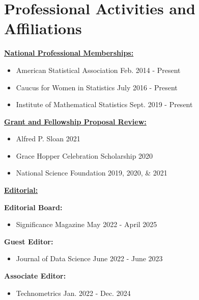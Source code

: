 \documentclass[11pt, letterpaper, roman]{moderncv} %
\begin{document}
\section{Professional Activities and Affiliations}

\underline{\textbf{\large National Professional Memberships:}}\normalsize
\begin{itemize}
    \item American Statistical Association \hfill Feb. 2014 - Present
    \item Caucus for Women in Statistics \hfill July 2016 - Present
    \item Institute of Mathematical Statistics \hfill Sept. 2019 - Present
\end{itemize}

\vspace{6pt}
\underline{\textbf{\large Grant and Fellowship Proposal Review:}}\normalsize

\begin{itemize}
    \item Alfred P. Sloan \hfill 2021
    \item Grace Hopper Celebration Scholarship \hfill 2020
    \item National Science Foundation \hfill 2019, 2020, \& 2021
\end{itemize}

\vspace{12pt}
\underline{\textbf{\large Editorial:}}\normalsize

\textbf{Editorial Board:}
\begin{itemize}
    \item Significance Magazine \hfill May 2022 - April 2025
\end{itemize}

\vspace{4pt}
\textbf{Guest Editor:}
\begin{itemize}
    \item Journal of Data Science \hfill June 2022 - June 2023
\end{itemize}

\vspace{4pt}
\textbf{Associate Editor:}
\begin{itemize}
    \item Technometrics \hfill Jan. 2022 - Dec. 2024
\end{itemize}
\end{document}
